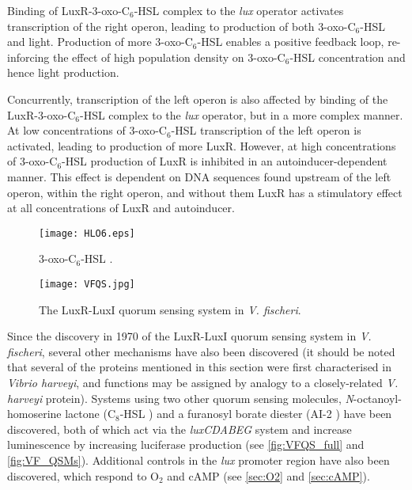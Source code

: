 Binding of LuxR-3-oxo-C$_6$-HSL complex to the \textit{lux} operator activates transcription of the right operon, leading to production of both 3-oxo-C$_6$-HSL  and light. Production of more 3-oxo-C$_6$-HSL  enables a positive feedback loop, re-inforcing the effect of high population density on 3-oxo-C$_6$-HSL  concentration and hence light production.

Concurrently, transcription of the left operon is also affected by binding of the LuxR-3-oxo-C$_6$-HSL complex to the \textit{lux} operator, but in a more complex manner. At low concentrations of 3-oxo-C$_6$-HSL  transcription of the left operon is activated, leading to production of more LuxR.
However, at high concentrations of 3-oxo-C$_6$-HSL  production of LuxR is inhibited in an autoinducer-dependent manner\cite{Dunlap1989}. This effect is dependent on DNA sequences found upstream of the left operon, within the right operon, and without them LuxR has a stimulatory effect at all concentrations of LuxR and autoinducer.




\begin{figure}[H]
	\begin{center}
		\texttt{[image: HLO6.eps]}
		\caption{3-oxo-C$_6$-HSL . \label{fig:HLO6}}
	\end{center}
\end{figure}

\begin{figure}[H]
	\begin{center}
		\texttt{[image: VFQS.jpg]}
		\caption{The LuxR-LuxI quorum sensing system in \textit{V. fischeri}. \label{fig:VF_QS}}
	\end{center}
\end{figure}


Since the discovery in 1970 of the LuxR-LuxI quorum sensing system in \textit{V. fischeri}, several other mechanisms have also been discovered (it should be noted that several of the proteins mentioned in this section were first characterised in \textit{Vibrio harveyi}, and functions may be assigned by analogy to a closely-related \textit{V. harveyi} protein\cite{Miyashiro2012}). Systems using two other quorum sensing molecules, \textit{N}-octanoyl-homoserine lactone (C$_8$-HSL ) and a furanosyl borate diester (AI-2 ) have been discovered, both of which act via the \textit{luxCDABEG} system and increase luminescence by increasing luciferase production\cite{Miyashiro2012,Verma2013} (see \ref{fig:VFQS_full} and \ref{fig:VF_QSMs}).
Additional controls in the \textit{lux} promoter region have also been discovered, which respond to O$_2$ and cAMP\cite{Miyashiro2012} (see \ref{sec:O2} and \ref{sec:cAMP}). 

